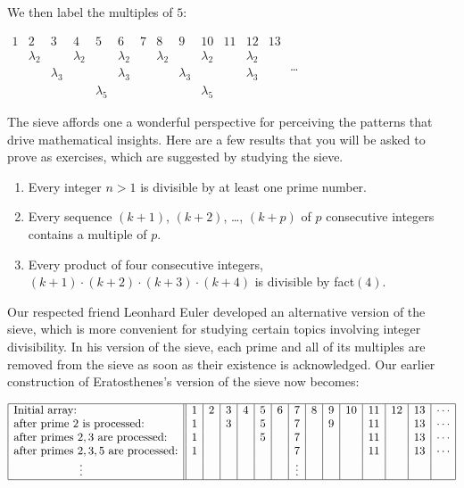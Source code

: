 \medskip

We then label the multiples of $5$:

\smallskip

\hspace*{.25in}$\begin{array}{c|c|c|c|c|c|c|c|c|c|c|c|c}
1 & 2 & 3 & 4 & 5 & 6 & 7 & 8 & 9 & 10 & 11 & 12 & 13 \\
 & \lambda_2 & & \lambda_2 & & \lambda_2 & & \lambda_2 & & \lambda_2 & & \lambda_2 & \\
 & & \lambda_3 & &  & \lambda_3 & & & \lambda_3 & & & \lambda_3 & \\
 & & & & \lambda_5 & & & & & \lambda_5 & & & 
\end{array}$ \ldots

\bigskip

The sieve affords one a wonderful perspective for perceiving the patterns that drive mathematical insights.  Here are a few results that you will be asked to prove as exercises, which are suggested by studying the sieve.
{\em
\begin{enumerate}
\item
Every integer $n > 1$ is divisible by at least one prime number.
\medskip\item
Every sequence $(k+1)$, $(k+2)$, \ldots , $(k+p)$ of $p$ consecutive integers contains a multiple of $p$.
\medskip\item
Every product of four consecutive integers, $(k+1) \cdot (k+2) \cdot (k+3) \cdot (k+4)$ is divisible by {\sc fact}$(4)$.
\end{enumerate}
}

\medskip

Our respected friend Leonhard Euler developed an alternative version of the sieve, which is more convenient for studying certain topics involving integer divisibility.  In his version of the sieve, each prime and all of its multiples are removed from the sieve as soon as their existence is acknowledged.  Our earlier construction of Eratosthenes's version of the sieve now becomes:


\medskip

\hspace*{.25in}$\begin{array}{|l||c|c|c|c|c|c|c|c|c|c|c|c|c|c|}
\hline
\mbox{Initial array:} &
1 & 2 & 3 & 4 & 5 & 6 & 7 & 8 & 9 & 10 & 11 & 12 & 13 & \cdots \\
\mbox{after prime $2$ is processed:} &
1 &  & 3 &  & 5 &  & 7 &  & 9 &  & 11 &  & 13 & \cdots \\
\mbox{after primes $2, 3$ are processed:} &
1 &  &  &  & 5 &  & 7 &  &  &  & 11 &  & 13 & \cdots \\
\mbox{after primes $2, 3, 5$ are processed:} &
1 &  &  &  &  &  & 7 &  &  &  & 11 &  & 13 & \cdots \\
\hspace*{.8in} \vdots  &
 &  &  &  &  &  & \vdots &  &  &  &  &  &  & \\
\hline
\end{array}$

